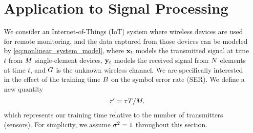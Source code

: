 \documentclass[12pt, draftclsnofoot,journal,onecolumn]{IEEEtran}
\begin{document}
\section{Application to Signal Processing}
\label{sec:signal_processing}
We consider an Internet-of-Things (IoT) system \cite{kim2018uplink,liu2018massive,de2018application,uccuncu2017performance}  where wireless devices are used for remote monitoring, and the data captured from those devices can be modeled by \eqref{eq:nonlinear_system_model}, where ${\mathbf{x}}_t$ models the transmitted signal at time $t$ from $M$ single-element devices, ${\mathbf{y}}_t$ models the received signal from $N$ elements at time $t$, and $G$ is the unknown wireless channel.  We are specifically interested in the effect of the training time $B$ on the symbol error rate (SER).   We define a new quantity
\begin{align}
    \tau'={{\tau T}}/{M},
    \label{eq:signal_processing_ratios}
\end{align}
which represents our training time relative to the number of transmitters (sensors). For simplicity, we assume $\sigma_{}^2=1$ throughout this section.
\end{document}
